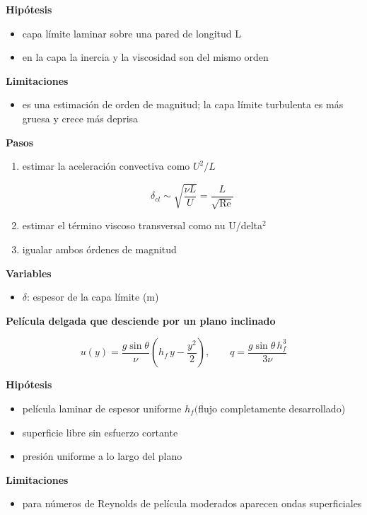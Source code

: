 \documentclass[10pt,openany]{book}
\begin{document}
\begin{tcolorbox}[title={Desarrollos del modelo}, studiumdef, breakable]
\noindent\textbf{Hipótesis}
\begin{itemize}
\item capa límite laminar sobre una pared de longitud L
\item en la capa la inercia y la viscosidad son del mismo orden
\end{itemize}

\noindent\textbf{Limitaciones}
\begin{itemize}
\item es una estimación de orden de magnitud; la capa límite turbulenta es más gruesa y crece más deprisa
\end{itemize}

\noindent\textbf{Pasos}
\begin{enumerate}
\item
estimar la aceleración convectiva como \(U^2/L\)

\[
\delta_{cl} \sim \sqrt{\frac{\nu L}{U}} = \frac{L}{\sqrt{\mathrm{Re}}}
\]
\item
estimar el término viscoso transversal como nu U/delta\(^2\)
\item
igualar ambos órdenes de magnitud
\end{enumerate}

\noindent\textbf{Variables}
\begin{itemize}
\item $\delta$: espesor de la capa límite ($\mathrm{m}$)
\end{itemize}



\noindent\textbf{Película delgada que desciende por un plano inclinado}

\begin{equation}
u(y) = \frac{g\sin\theta}{\nu}\left(h_f\,y - \frac{y^{2}}{2}\right),\qquad q = \frac{g\sin\theta\,h_f^{3}}{3\nu}
\label{eq:c15-pelicula}
\end{equation}

\noindent\textbf{Hipótesis}
\begin{itemize}
\item película laminar de espesor uniforme \(h_f (\)flujo completamente desarrollado)
\item superficie libre sin esfuerzo cortante
\item presión uniforme a lo largo del plano
\end{itemize}

\noindent\textbf{Limitaciones}
\begin{itemize}
\item para números de Reynolds de película moderados aparecen ondas superficiales
\end{itemize}


\end{tcolorbox}
\end{document}
